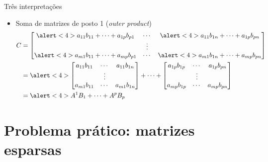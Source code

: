 \documentclass[]{beamer}
\begin{document}
\begin{frame}{Três interpretações}
\begin{itemize}
  \item<only@4> Soma de matrizes de posto 1 (\textit{outer product})
    \[
    \begin{split}
      C & =
      \begin{bmatrix}
        \alert<4>{a_{11} b_{11}} + \cdots + a_{1p} b_{p1} & \cdots &
        \alert<4>{a_{11} b_{1n}} + \cdots + a_{1p} b_{pn}\\
        & \vdots & \\
        \alert<4>{a_{m1} b_{11}} + \cdots + a_{mp} b_{p1} & \cdots &
        \alert<4>{a_{m1} b_{1n}} + \cdots + a_{mp} b_{pn}
      \end{bmatrix} \\
      & =
      \alert<4>{
        \begin{bmatrix}
          a_{11} b_{11} & \cdots & a_{11} b_{1n} \\
          & \vdots & \\
          a_{m1} b_{11} & \cdots & a_{m1} b_{1n}
        \end{bmatrix}
      } + \cdots + 
      \begin{bmatrix}
        a_{1p} b_{1p} & \cdots & a_{1p} b_{pn} \\
        & \vdots & \\
        a_{mp} b_{1p} & \cdots & a_{mp} b_{pn}
      \end{bmatrix}
      \\
      & = \alert<4>{A^1 B_1} + \cdots + A^p B_p
    \end{split}
    \]

  \end{itemize}
  
\end{frame}

\section{Problema prático: matrizes esparsas}
\end{document}
